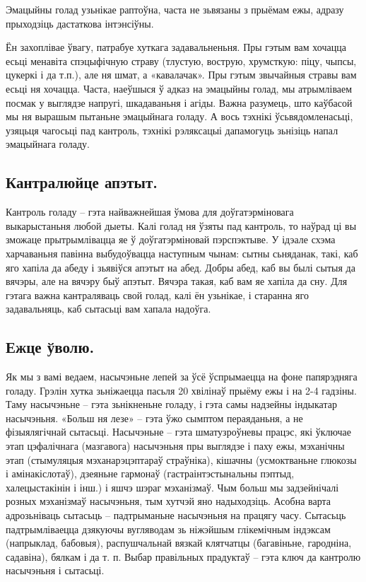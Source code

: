 Эмацыйны голад узьнікае раптоўна, часта не зьвязаны з прыёмам ежы, адразу прыходзіць дастаткова інтэнсіўны.

Ён захоплівае ўвагу, патрабуе хуткага задавальненьня. Пры гэтым вам хочацца есьці менавіта спэцыфічную страву (тлустую, вострую, хрумсткую: піцу, чыпсы, цукеркі і да т.п.), але ня шмат, а «кавалачак». Пры гэтым звычайныя стравы вам есьці ня хочацца. Часта, наеўшыся ў адказ на эмацыйны голад, мы атрымліваем посмак у выглядзе напругі, шкадаваньня і агіды. Важна разумець, што каўбасой мы ня вырашым пытаньне эмацыйнага голаду. А вось тэхнікі ўсьвядомленасьці, узяцьця чагосьці пад кантроль, тэхнікі рэляксацыі дапамогуць зьнізіць напал эмацыйнага голаду.

\subsection{Кантралюйце апэтыт.}
Кантроль голаду – гэта найважнейшая ўмова для доўгатэрміновага выкарыстаньня любой дыеты. Калі голад ня ўзяты пад кантроль, то наўрад ці вы зможаце прытрымлівацца яе ў доўгатэрміновай пэрспэктыве. У ідэале схэма харчаваньня павінна выбудоўвацца наступным чынам: сытны сьняданак, такі, каб яго хапіла да абеду і зьявіўся апэтыт на абед. Добры абед, каб вы былі сытыя да вячэры, але на вячэру быў апэтыт. Вячэра такая, каб вам яе хапіла да сну. Для гэтага важна кантраляваць свой голад, калі ён узьнікае, і старанна яго задавальняць, каб сытасьці вам хапала надоўга.

\subsection{Ежце ўволю.}
Як мы з вамі ведаем, насычэньне лепей за ўсё ўспрымаецца на фоне папярэдняга голаду. Грэлін хутка зьніжаецца пасьля 20 хвілінаў прыёму ежы і на 2-4 гадзіны. Таму насычэньне – гэта зьнікненьне голаду, і гэта самы надзейны індыкатар насычэньня. «Больш ня лезе» – гэта ўжо сымптом пераяданьня, а не фізыялягічнай сытасьці. Насычэньне – гэта шматузроўневы працэс, які ўключае этап цэфалічнага (мазгавога) насычэньня пры выглядзе і паху ежы, мэханічны этап (стымуляцыя мэханарэцэптараў страўніка), кішачны (усмоктваньне глюкозы і амінакіслотаў), дзеяньне гармонаў (гастраінтэстынальны пэптыд, халецыстакінін і інш.) і яшчэ шэраг мэханізмаў. Чым больш мы задзейнічалі розных мэханізмаў насычэньня, тым хутчэй яно надыходзіць. Асобна варта адрозьніваць сытасьць – падтрыманьне насычэньня на працягу часу. Сытасьць падтрымліваецца дзякуючы вугляводам зь ніжэйшым глікемічным індэксам (напрыклад, бабовыя), распушчальнай вязкай клятчатцы (багавіньне, гародніна, садавіна), бялкам і да т. п. Выбар правільных прадуктаў – гэта ключ да кантролю насычэньня і сытасьці.


